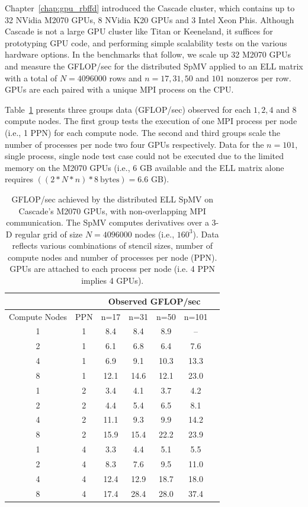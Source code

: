 Chapter~\ref{chap:gpu_rbffd} introduced the Cascade cluster, which contains up to 32 NVidia M2070 GPUs, 8 NVidia K20 GPUs and 3 Intel Xeon Phis. Although Cascade is not a large GPU cluster like Titan or Keeneland, it suffices for prototyping GPU code, and performing simple scalability tests on the various hardware options. In the benchmarks that follow, we scale up 32 M2070 GPUs and measure the GFLOP/sec for the distributed SpMV applied to an ELL matrix with a total of $N=4096000$ rows and $n=17, 31, 50$ and $101$ nonzeros per row. GPUs are each paired with a unique MPI process on the CPU. 

Table~\ref{tbl:cascade_m2070_nonoverlap} presents three groups data (GFLOP/sec) observed for each $1, 2, 4$ and $8$ compute nodes. The first group tests the execution of one MPI process per node (i.e., 1 PPN) for each compute node. The second and third groups scale the number of processes per node two four GPUs respectively. Data for the $n=101$, single process, single node test case could not be executed due to the limited memory on the M2070 GPUs (i.e., 6 GB available and the ELL matrix alone requires $((2*N*n)*8\ \text{bytes}) = 6.6$ GB).

\begin{table}[htb]
\centering
\caption{GFLOP/sec achieved by the distributed ELL SpMV on Cascade's M2070 GPUs, with non-overlapping MPI communication. The SpMV computes derivatives over a 3-D regular grid of size $N=4096000$ nodes (i.e., $160^3$). Data reflects various combinations of stencil sizes, number of compute nodes and number of processes per node (PPN). GPUs are attached to each process per node (i.e. 4 PPN implies 4 GPUs). }
\label{tbl:cascade_m2070_nonoverlap}
\begin{tabular}{c|c|c|c|c|c|c}
 \multicolumn{2}{c}{ } & \multicolumn{4}{|c|}{Observed GFLOP/sec} \\  \hline
Compute Nodes &   PPN  &   n=17   &   n=31   &   n=50   &   n=101   \\ \hline
1  &  1  &  8.4  &  8.4  &  8.9  & --  \\
2  &  1  &  6.1  &  6.8  &  6.4  &  7.6 \\
4  &  1  &  6.9  &  9.1  &  10.3  &  13.3 \\
8  &  1  &  12.1  &  14.6  &  12.1  &  23.0 \\ \hline
1  &  2  &  3.4  &  4.1  &  3.7  &  4.2 \\
2  &  2  &  4.4  &  5.4  &  6.5  &  8.1 \\
4  &  2  &  11.1  &  9.3  &  9.9  &  14.2 \\
8  &  2  &  15.9  &  15.4  &  22.2  &  23.9 \\ \hline
1  &  4  &  3.3  &  4.4  &  5.1  &  5.5 \\
2  &  4  &  8.3  &  7.6  &  9.5  &  11.0 \\
4  &  4  &  12.4  &  12.9  &  18.7  &  18.0 \\
8  &  4  &  17.4  &  28.4  &  28.0  &  37.4 
\end{tabular} 
\end{table}


